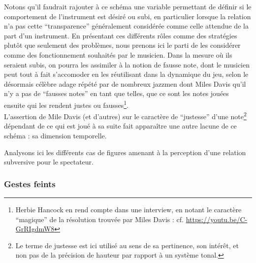 \indent Notons qu'il faudrait rajouter à ce schéma une variable permettant de définir si le comportement de l'instrument est désiré ou subi, en particulier lorsque la relation n'a pas cette ``transparence'' généralement considérée comme celle attendue de la part d'un instrument. En présentant ces différents rôles comme des stratégies plutôt que seulement des problèmes, nous prenons ici le parti de les considérer comme des fonctionnement souhaités par le musicien. Dans la mesure où ils seraient subis, on pourra les assimiler à la notion de fausse note, dont le musicien peut tout à fait s'accomoder en les réutilisant dans la dynamique du jeu, selon le désormais célèbre adage répété par de nombreux jazzmen dont Miles Davis qu'il n'y a pas de ``fausses notes'' en tant que telles, que ce sont les notes jouées ensuite qui les rendent justes ou fausses\footnote{Herbie Hancock en rend compte dans une interview, en notant le caractère ``magique'' de la résolution trouvée par Miles Davis :  cf. \url{https://youtu.be/C-GrRIgdmW8}}.\\
\indent L'assertion de Mile Davis (et d'autres) sur le caractère de ``justesse'' d'une note\footnote{Le terme de justesse est ici utilisé au sens de sa pertinence, son intérêt, et non pas de la précision de hauteur par rapport à un système tonal.} dépendant de ce qui est joué à sa suite fait apparaître une autre lacune de ce schéma : sa dimension temporelle.

\noindent Analysons ici les différents cas de figures amenant à la perception d'une relation subversive pour le spectateur. 

\subsubsection{Gestes feints}

